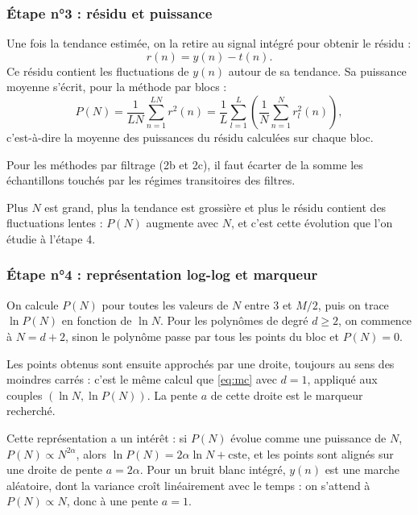 \documentclass[11pt,a4paper]{article}
\begin{document}
\subsubsection{Étape n°3 : résidu et puissance}

Une fois la tendance estimée, on la retire au signal intégré pour obtenir le résidu :
\begin{equation}
  r(n) = y(n) - t(n).
\end{equation}
Ce résidu contient les fluctuations de $y(n)$ autour de sa tendance. Sa puissance moyenne
s'écrit, pour la méthode par blocs :
\begin{equation}
  P(N) = \frac{1}{LN} \sum_{n=1}^{LN} r^2(n)
       = \frac{1}{L} \sum_{l=1}^{L} \left( \frac{1}{N} \sum_{n=1}^{N} r_l^2(n) \right),
  \label{eq:PN}
\end{equation}
c'est-à-dire la moyenne des puissances du résidu calculées sur chaque bloc.

Pour les méthodes par filtrage (2b et 2c), il faut écarter de la somme les échantillons
touchés par les régimes transitoires des filtres.

Plus $N$ est grand, plus la tendance est grossière et plus le résidu contient des
fluctuations lentes : $P(N)$ augmente avec $N$, et c'est cette évolution que l'on étudie à
l'étape 4.

\subsubsection{Étape n°4 : représentation log-log et marqueur}

On calcule $P(N)$ pour toutes les valeurs de $N$ entre 3 et $M/2$, puis on trace
$\ln P(N)$ en fonction de $\ln N$. Pour les polynômes de degré $d \geq 2$, on commence à
$N = d+2$, sinon le polynôme passe par tous les points du bloc et $P(N) = 0$.

Les points obtenus sont ensuite approchés par une droite, toujours au sens des moindres
carrés : c'est le même calcul que \eqref{eq:mc} avec $d = 1$, appliqué aux couples
$(\ln N, \ln P(N))$. La pente $a$ de cette droite est le marqueur recherché.

Cette représentation a un intérêt : si $P(N)$ évolue comme une puissance de $N$,
$P(N) \propto N^{2\alpha}$, alors $\ln P(N) = 2\alpha \ln N + \text{cste}$, et les points
sont alignés sur une droite de pente $a = 2\alpha$. Pour un bruit blanc intégré, $y(n)$ est
une marche aléatoire, dont la variance croît linéairement avec le temps : on s'attend à
$P(N) \propto N$, donc à une pente $a = 1$.
\end{document}
